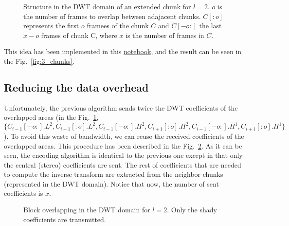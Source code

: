 
\begin{figure}
  \centering
  \caption{Structure in the DWT domain of an extended chunk for
    $l=2$. $o$ is the number of frames to overlap between adajacent
    chunks. $C[:o]$ represents the first $o$ framees of the chunk $C$
    and $C[-o:]$ the last $x-o$ frames of chunk C, where $x$ is the
    number of frames in $C$.}
  \label{fig:subbands}
\end{figure}

This idea has been implemented in this
\href{https://github.com/Tecnologias-multimedia/intercom/blob/master/docs/overlapped_DWT_I.ipynb}{notebook},
and the result can be seen in the Fig.~\ref{fig:3_chunks}.

\subsection{Reducing the data overhead}

Unfortunately, the previous algorithm sends twice the DWT coefficients
of the overlapped areas (in the Fig.~\ref{fig:subbands},
$\{C_{i-1}[-o:].L^2, C_{i+1}[:o].L^2, C_{i-1}[-o:].H^2,
C_{i+1}[:o].H^2, C_{i-1}[-o:].H^1, C_{i+1}[:o].H^1\}$). To avoid this
waste of bandwidth, we can reuse the received coefficients of the
overlapped areas. This procedure has been described in the
Fig.~\ref{fig:overlapping}. As it can be seen, the encoding algorithm
is identical to the previous one except in that only the central
(stereo) coefficients are sent. The rest of coefficients that are
needed to compute the inverse transform are extracted from the
neighbor chunks (represented in the DWT domain). Notice that now, the
number of sent coefficients is $x$.

\begin{figure}
  \centering
  \caption{Block overlapping in the DWT domain for $l=2$. Only the
    shady coefficients are transmitted.}
  \label{fig:overlapping}
\end{figure}

